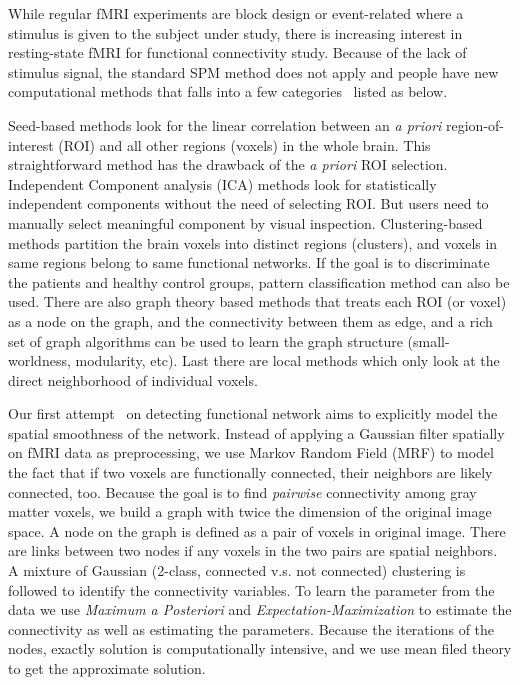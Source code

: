 \documentclass[]{article}
\begin{document}
While regular fMRI experiments are block design or event-related where a
stimulus is given to the subject under study, there is increasing interest in
resting-state fMRI for functional connectivity study. Because of the lack of
stimulus signal, the standard SPM method does not apply and people have new
computational methods that falls into a few
categories~\cite{margulies2010resting} listed  as below.

Seed-based methods look for the linear correlation between an \emph{a priori}
region-of-interest (ROI) and all other regions (voxels) in the whole brain. This
straightforward method has the drawback of the \emph{a priori} ROI
selection. Independent Component analysis (ICA) methods look for statistically
independent components without the need of selecting ROI. But users need to
manually select meaningful component by visual inspection. Clustering-based
methods partition the brain voxels into distinct regions (clusters), and voxels
in same regions belong to same functional networks. If the goal is to
discriminate the patients and healthy control groups, pattern classification
method can also be used. There are also graph theory based methods that treats
each ROI (or voxel) as a node on the graph, and the connectivity between them as
edge, and a rich set of graph algorithms can be used to learn the graph
structure (small-worldness, modularity, etc). Last there are local methods which
only look at the direct neighborhood of individual voxels.

Our first attempt~\cite{SCI:Liu2010a} on detecting functional network aims to
explicitly model the spatial smoothness of the network. Instead of applying a
Gaussian filter spatially on fMRI data as preprocessing, we use Markov Random
Field (MRF) to model the fact that if two voxels are functionally connected,
their neighbors are likely connected, too. Because the goal is to find
\emph{pairwise} connectivity among gray matter voxels, we build a graph with
twice the dimension of the original image space. A node on the graph is defined
as a pair of voxels in original image. There are links between two nodes if any
voxels in the two pairs are spatial neighbors. A mixture of Gaussian (2-class,
connected v.s. not connected) clustering is followed to identify the
connectivity variables. To learn the parameter from the data we use
\emph{Maximum a Posteriori} and \emph{Expectation-Maximization} to estimate the
connectivity as well as estimating the parameters. Because the iterations of the
nodes, exactly solution is computationally intensive, and we use mean filed
theory to get the approximate solution.
\end{document}

